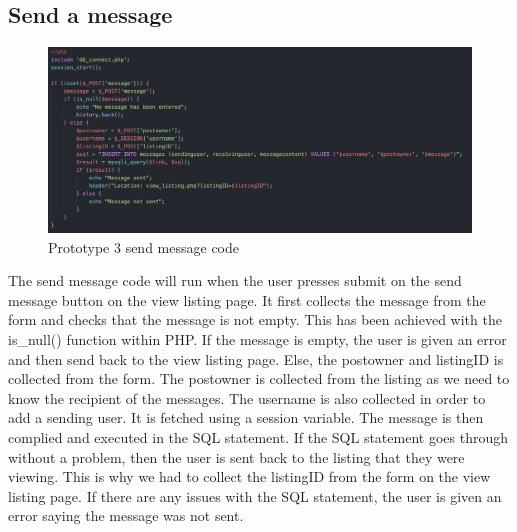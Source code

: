\subsection{Send a message}
 \begin{figure}[H]
    \centering
    \includegraphics[scale=0.5]{ch3_developing/proto3/messageseller.png}
    \caption{Prototype 3 send message code}
    \label{fig:proto3_sendmessagecode}
\end{figure}
The send message code will run when the user presses submit on the send message button on the view listing page. It first collects the message from the form and checks that the message is not empty. This has been achieved with the is\_null() function within PHP. If the message is empty, the user is given an error and then send back to the view listing page. Else, the postowner and listingID is collected from the form. The postowner is collected from the listing as we need to know the recipient of the messages. The username is also collected in order to add a sending user. It is fetched using a session variable. The message is then complied and executed in the SQL statement. If the SQL statement goes through without a problem, then the user is sent back to the listing that they were viewing. This is why we had to collect the listingID from the form on the view listing page. If there are any issues with the SQL statement, the user is given an error saying the message was not sent. 
